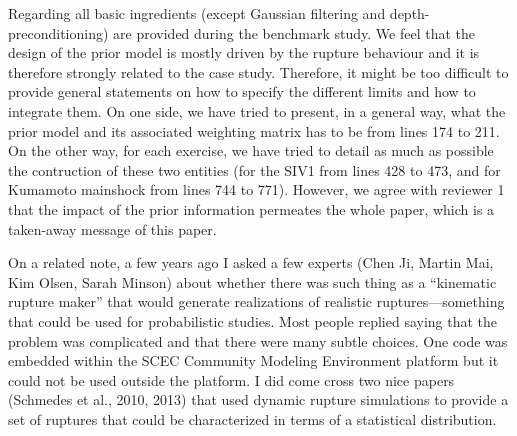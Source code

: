 \documentclass[10pt]{extarticle}
\begin{document}
\begin{Answer}
Regarding all basic ingredients (except Gaussian filtering and depth-preconditioning) are provided during the benchmark study. We feel that the design of the prior model is mostly driven by the rupture behaviour and it is therefore strongly related to the case study. Therefore, it might be too difficult to provide general statements on how to specify the different limits and how to integrate them. On one side, we have tried to present, in a general way, what the prior model and its associated weighting matrix has to be from lines 174 to 211. On the other way, for each exercise, we have tried to detail as much as possible the contruction of these two entities (for the SIV1 from lines 428 to 473, and for Kumamoto mainshock from lines 744 to 771).
However, we agree with reviewer 1 that the impact of the prior information permeates the whole paper, which is a taken-away message of this paper.
 \WorkInProgressRevTask
\end{Answer}
%
%
\begin{ReviewerComment}{1}
\noindent 
 On a related note, a few years ago I asked a few experts (Chen Ji, Martin Mai, Kim
 Olsen, Sarah Minson) about whether there was such thing as a “kinematic rupture maker”
 that would generate realizations of realistic ruptures—something that could be used for
 probabilistic studies. Most people replied saying that the problem was complicated and
 that there were many subtle choices. One code was embedded within the SCEC Community
 Modeling Environment platform but it could not be used outside the platform.
 I did come cross two nice papers (Schmedes et al., 2010, 2013) that used dynamic rupture
 simulations to provide a set of ruptures that could be characterized in terms of a statistical
 distribution.
\end{ReviewerComment}
\end{document}
